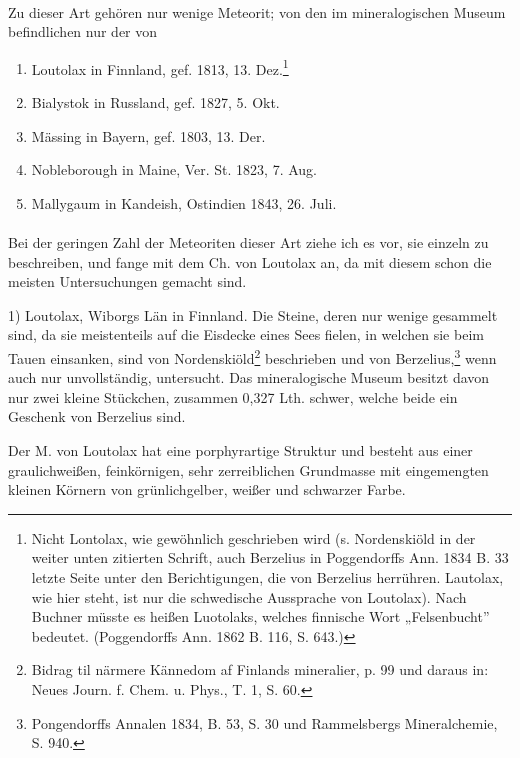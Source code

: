 \documentclass[a4paper, 11pt, oneside]{article}
\begin{document}
\paragraph{}
Zu dieser Art gehören nur wenige Meteorit; von den im mineralogischen Museum befindlichen nur der von
\begin{enumerate}
    \item Loutolax in Finnland, gef. 1813, 13. Dez.\footnote{Nicht Lontolax, wie gewöhnlich geschrieben wird (s. Nordenskiöld in der weiter unten zitierten Schrift, auch Berzelius in Poggendorffs Ann. 1834 B. 33 letzte Seite unter den Berichtigungen, die von Berzelius herrühren. Lautolax, wie hier steht, ist nur die schwedische Aussprache von Loutolax). Nach Buchner müsste es heißen Luotolaks, welches finnische Wort „Felsenbucht” bedeutet. (Poggendorffs Ann. 1862 B. 116, S. 643.)}
    \item Bialystok in Russland, gef. 1827, 5. Okt.
    \item Mässing in Bayern, gef. 1803, 13. Der.
    \item Nobleborough in Maine, Ver. St. 1823, 7. Aug.
    \item Mallygaum in Kandeish, Ostindien 1843, 26. Juli.
\end{enumerate}
\paragraph{}
Bei der geringen Zahl der Meteoriten dieser Art ziehe ich es vor, sie einzeln zu beschreiben, und fange mit dem Ch. von Loutolax an, da mit diesem schon die meisten Untersuchungen gemacht sind.

1) Loutolax, Wiborgs Län in Finnland. Die Steine, deren nur wenige gesammelt sind, da sie meistenteils auf die Eisdecke eines Sees fielen, in welchen sie beim Tauen einsanken, sind von Nordenskiöld\footnote{Bidrag til närmere Kännedom af Finlands mineralier, p. 99 und daraus in: Neues Journ. f. Chem. u. Phys., T. 1, S. 60.} beschrieben und von Berzelius,\footnote{Pongendorffs Annalen 1834, B. 53, S. 30 und Rammelsbergs Mineralchemie, S. 940.} wenn auch nur unvollständig, untersucht. Das mineralogische Museum besitzt davon nur zwei kleine Stückchen, zusammen 0,327 Lth. schwer, welche beide ein Geschenk von Berzelius sind.

Der M. von Loutolax hat eine porphyrartige Struktur und besteht aus einer graulichweißen, feinkörnigen, sehr zerreiblichen Grundmasse mit eingemengten kleinen Körnern von grünlichgelber, weißer und schwarzer Farbe.
\end{document}
